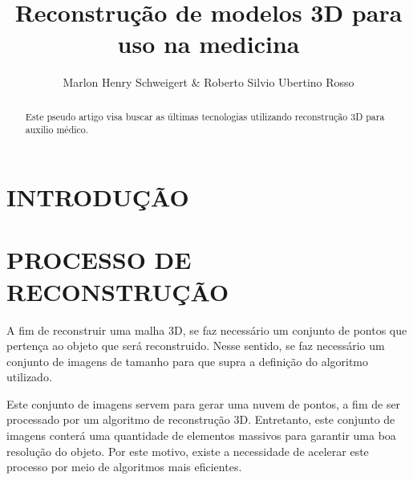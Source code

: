\documentclass[letterpaper, 10 pt, conference]{ieeeconf}
\title{\LARGE \bf
Reconstrução de modelos 3D para uso na medicina
}
\author{Marlon Henry Schweigert \& Roberto Silvio Ubertino Rosso }
\begin{document}
\maketitle
\thispagestyle{empty}
\pagestyle{empty}


\begin{abstract}
Este pseudo artigo visa buscar as últimas tecnologias utilizando reconstrução 3D para auxilio médico.
\end{abstract}


\section{INTRODUÇÃO}


\section{PROCESSO DE RECONSTRUÇÃO}

A fim de reconstruir uma malha 3D, se faz necessário um conjunto de pontos que pertença ao objeto que será reconstruido.
%
Nesse sentido, se faz necessário um conjunto de imagens de tamanho para que supra a definição do algoritmo utilizado.

Este conjunto de imagens servem para gerar uma nuvem de pontos, a fim de ser processado por um algoritmo de reconstrução 3D.
%
Entretanto, este conjunto de imagens conterá uma quantidade de elementos massivos para garantir uma boa resolução do objeto.
%
Por este motivo, existe a necessidade de acelerar este processo por meio de algoritmos mais eficientes.



\end{document}
